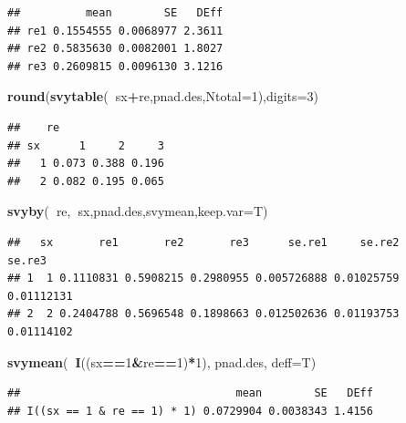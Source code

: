 \documentclass[]{book}
\newenvironment{Shaded}{\begin{snugshade}}{\end{snugshade}}
\newcommand{\KeywordTok}[1]{\textcolor[rgb]{0.13,0.29,0.53}{\textbf{#1}}}
\newcommand{\DataTypeTok}[1]{\textcolor[rgb]{0.13,0.29,0.53}{#1}}
\newcommand{\DecValTok}[1]{\textcolor[rgb]{0.00,0.00,0.81}{#1}}
\newcommand{\OperatorTok}[1]{\textcolor[rgb]{0.81,0.36,0.00}{\textbf{#1}}}
\newcommand{\NormalTok}[1]{#1}
\theoremstyle{definition}
\theoremstyle{definition}
\theoremstyle{definition}
\theoremstyle{remark}
\begin{document}
\begin{verbatim}
##          mean        SE   DEff
## re1 0.1554555 0.0068977 2.3611
## re2 0.5835630 0.0082001 1.8027
## re3 0.2609815 0.0096130 3.1216
\end{verbatim}

\begin{Shaded}
\begin{Highlighting}[]
\KeywordTok{round}\NormalTok{(}\KeywordTok{svytable}\NormalTok{(}\OperatorTok{~}\NormalTok{sx}\OperatorTok{+}\NormalTok{re,pnad.des,}\DataTypeTok{Ntotal=}\DecValTok{1}\NormalTok{),}\DataTypeTok{digits=}\DecValTok{3}\NormalTok{)}
\end{Highlighting}
\end{Shaded}

\begin{verbatim}
##    re
## sx      1     2     3
##   1 0.073 0.388 0.196
##   2 0.082 0.195 0.065
\end{verbatim}

\begin{Shaded}
\begin{Highlighting}[]
\KeywordTok{svyby}\NormalTok{(}\OperatorTok{~}\NormalTok{re,}\OperatorTok{~}\NormalTok{sx,pnad.des,svymean,}\DataTypeTok{keep.var=}\NormalTok{T)}
\end{Highlighting}
\end{Shaded}

\begin{verbatim}
##   sx       re1       re2       re3      se.re1     se.re2     se.re3
## 1  1 0.1110831 0.5908215 0.2980955 0.005726888 0.01025759 0.01112131
## 2  2 0.2404788 0.5696548 0.1898663 0.012502636 0.01193753 0.01114102
\end{verbatim}

\begin{Shaded}
\begin{Highlighting}[]
\KeywordTok{svymean}\NormalTok{(}\OperatorTok{~}\KeywordTok{I}\NormalTok{((sx}\OperatorTok{==}\DecValTok{1}\OperatorTok{&}\NormalTok{re}\OperatorTok{==}\DecValTok{1}\NormalTok{)}\OperatorTok{*}\DecValTok{1}\NormalTok{), pnad.des, }\DataTypeTok{deff=}\NormalTok{T)}
\end{Highlighting}
\end{Shaded}

\begin{verbatim}
##                                 mean        SE   DEff
## I((sx == 1 & re == 1) * 1) 0.0729904 0.0038343 1.4156
\end{verbatim}
\end{document}
